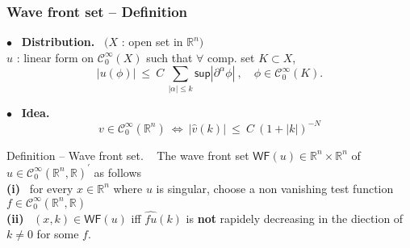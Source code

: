 \documentclass[9pt]{beamer}
\newcommand{\abs}[1]{\left|{#1}\right|} %
\renewcommand{\sup}{\mathsf{sup}} %
\newcommand{\WF}{\mathsf{WF}} %
\newcommand{\Ccal}{\mathcal{C}}
\newcommand{\Rbb}{\mathbb{R}}
\begin{document}
\begin{frame}

\frametitle{Wave front set -- Definition}

\vfill

$\bullet$ \ \textbf{Distribution.} \ $\big( X$ : open set in $\Rbb^n \big)$ \\
$u$ : linear form on $\Ccal^\infty_0(X)$ such that $\forall$ comp. set $K \subset X$,
\vspace*{-6pt}
\begin{equation*}
\abs{u(\phi)} \ \leq \ C \ \sum_{\abs{\alpha} \leq k} \sup\abs{\partial^\alpha \phi}   \ , \quad \phi \in \Ccal^\infty_0(K) .
\end{equation*}

\vfill

$\bullet$ \ \textbf{Idea.} 
\vspace*{-6pt}
\begin{equation*}
v \in \Ccal^\infty_0(\Rbb^n) \ \Leftrightarrow \ \abs{\hat{v}(k)} \ \leq \ C \ \left( 1 + \abs{k} \right)^{-N} 
\end{equation*}

\vfill

\begin{block}{Definition -- Wave front set. \ }
 The wave front set $\WF(u) \in \Rbb^n \times \Rbb^n$ of $u \in \Ccal^\infty_0(\Rbb^n, \Rbb)^\prime$ as follows \\[2pt]
\qquad \textbf{(i)} \ for every $x \in \Rbb^n$ where $u$ is singular, choose a non vanishing test function $f \in \Ccal^\infty_0(\Rbb^n, \Rbb)$ \\[2pt]
\qquad \textbf{(ii)} \ $(x,k) \in \WF(u)$ iff $\hat{fu}(k)$ is \textbf{not} rapidely decreasing in the diection of $k \neq 0$ for some $f$.
\end{block}

\vfill

\end{frame}
\end{document}
